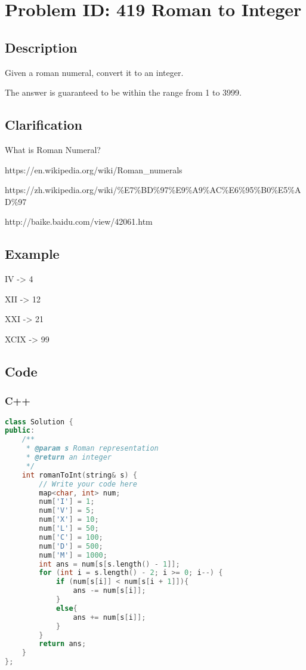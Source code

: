 \section{Problem ID: 419 Roman to Integer}
\subsection{Description}
Given a roman numeral, convert it to an integer.

The answer is guaranteed to be within the range from 1 to 3999.

\subsection{Clarification}
What is Roman Numeral?

https://en.wikipedia.org/wiki/Roman\_numerals

https://zh.wikipedia.org/wiki/\%E7\%BD\%97\%E9\%A9\%AC\%E6\%95\%B0\%E5\%AD\%97

http://baike.baidu.com/view/42061.htm


\subsection{Example}
IV -> 4

XII -> 12

XXI -> 21

XCIX -> 99

\subsection{Code}
\scriptsize
\subsubsection{C++}
\begin{lstlisting}[language=C++]
class Solution {
public:
    /**
     * @param s Roman representation
     * @return an integer
     */
    int romanToInt(string& s) {
        // Write your code here
        map<char, int> num;
        num['I'] = 1;
        num['V'] = 5;
        num['X'] = 10;
        num['L'] = 50;
        num['C'] = 100;
        num['D'] = 500;
        num['M'] = 1000;
        int ans = num[s[s.length() - 1]];
        for (int i = s.length() - 2; i >= 0; i--) {
            if (num[s[i]] < num[s[i + 1]]){
                ans -= num[s[i]];
            }
            else{
                ans += num[s[i]];
            }
        }
        return ans;
    }
};
\end{lstlisting}

